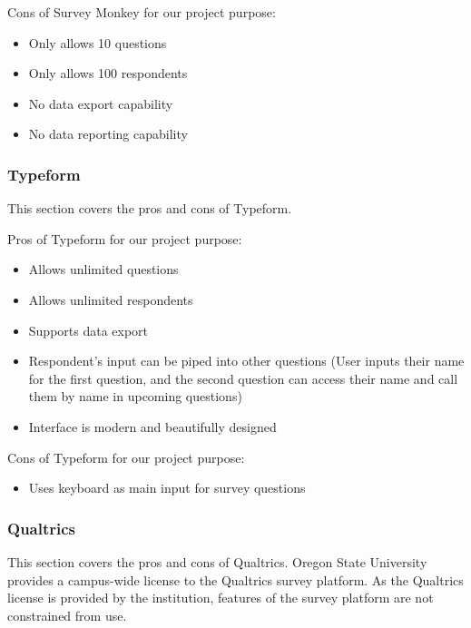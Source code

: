 \documentclass[10pt,journal,compsoc,draftclsnofoot]{IEEEtran}
\begin{document}
Cons of Survey Monkey for our project purpose:
\begin{itemize}
\item Only allows 10 questions
\item Only allows 100 respondents
\item No data export capability
\item No data reporting capability
\end{itemize}

\subsubsection{Typeform}
This section covers the pros and cons of Typeform.

Pros of Typeform for our project purpose:
\begin{itemize}
\item Allows unlimited questions
\item Allows unlimited respondents
\item Supports data export
\item Respondent's input can be piped into other questions (User inputs their name for the first question, and the second question can access their name and call them by name in upcoming questions)
\item Interface is modern and beautifully designed
\end{itemize}

Cons of Typeform for our project purpose:
\begin{itemize}
\item Uses keyboard as main input for survey questions
\end{itemize}

\subsubsection{Qualtrics}
This section covers the pros and cons of Qualtrics.
Oregon State University provides a campus-wide license to the Qualtrics survey platform.
As the Qualtrics license is provided by the institution, features of the survey platform are not constrained from use.
\end{document}
